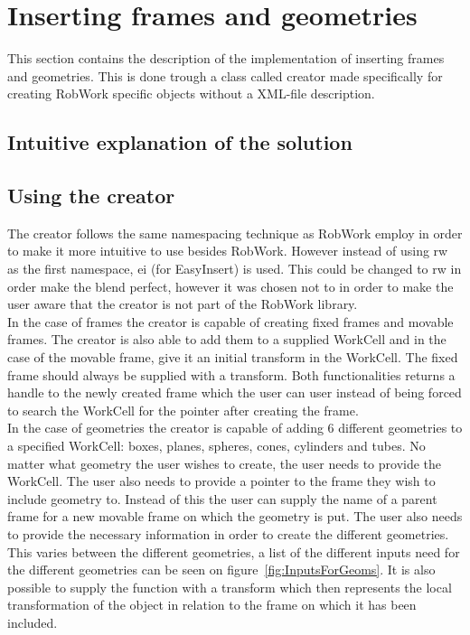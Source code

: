 \section{Inserting frames and geometries}
This section contains the description of the implementation of inserting frames and geometries. This is done trough a class called creator made specifically for creating RobWork specific objects without a XML-file description.

\subsection{Intuitive explanation of the solution}

\subsection{Using the creator}
The creator follows the same namespacing technique as RobWork employ in order to make it more intuitive to use besides RobWork. However instead of using rw as the first namespace, ei (for EasyInsert) is used. This could be changed to rw in order make the blend perfect, however it was chosen not to in order to make the user aware that the creator is not part of the RobWork library.\\

In the case of frames the creator is capable of creating fixed frames and movable frames. The creator is also able to add them to a supplied WorkCell and in the case of the movable frame, give it an initial transform in the WorkCell. The fixed frame should always be supplied with a transform. 
Both functionalities returns a handle to the newly created frame which the user can user instead of being forced to search the WorkCell for the pointer after creating the frame.\\

In the case of geometries the creator is capable of adding 6 different geometries to a specified WorkCell: boxes, planes, spheres, cones, cylinders and tubes. No matter what geometry the user wishes to create, the user needs to provide the WorkCell. The user also needs to provide a pointer to the frame they wish to include geometry to. Instead of this the user can supply the name of a parent frame for a new movable frame on which the geometry is put. The user also needs to provide the necessary information in order to create the different geometries. This varies between the different geometries, a list of the different inputs need for the different geometries can be seen on figure~\ref{fig:InputsForGeoms}. It is also possible to supply the function with a transform which then represents the local transformation of the object in relation to the frame on which it has been included.\\

